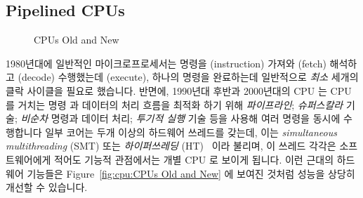 \subsection{Pipelined CPUs}
\label{sec:cpu:Pipelined CPUs}

\begin{figure}[tb]
\centering
{}
\caption{CPUs Old and New}
\end{figure}

1980년대에 일반적인 마이크로프로세서는 명령을 (instruction) 가져와 (fetch)
해석하고 (decode) 수행했는데 (execute), 하나의 명령을 완료하는데 일반적으로
\emph{최소} 세개의 클락 사이클을 필요로 했습니다.
반면에, 1990년대 후반과 2000년대의 CPU 는 CPU 를 거치는 명령 과 데이터의 처리
흐름을 최적화 하기 위해 \emph{파이프라인}; \emph{슈퍼스칼라} 기술;
\emph{비순차} 명령과 데이터 처리; \emph{투기적 실행}  기술 등을 사용해 여러
명령을 동시에 수행합니다
일부 코어는 두개 이상의 하드웨어 쓰레드를 갖는데, 이는 \emph{simultaneous
multithreading} (SMT) 또는 \emph{하이퍼쓰레딩} (HT)~\cite{JFennel1973SMT} 이라
불리며, 이 쓰레드 각각은 소프트웨어에게 적어도 기능적 관점에서는 개별 CPU 로
보이게 됩니다.
이런 근대의 하드웨어 기능들은 Figure~\ref{fig:cpu:CPUs Old and New} 에 보여진
것처럼 성능을 상당히 개선할 수 있습니다.

